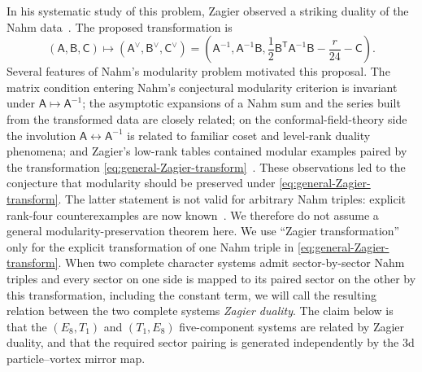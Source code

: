 \documentclass[11pt,a4paper]{article}
\numberwithin{equation}{section}
\begin{document}
In his systematic study of this problem, Zagier observed a striking duality of the Nahm data~\cite{Zagier:2007dilogarithm}.  The proposed transformation is
\begin{equation}
  (\mathsf A,\mathsf B,\mathsf C)
  \longmapsto
  (\mathsf A^\vee,\mathsf B^\vee,\mathsf C^\vee)
  =
  \left(
  \mathsf A^{-1},
  \mathsf A^{-1}\mathsf B,
  \frac12\mathsf B^{\mathsf T}\mathsf A^{-1}\mathsf B
  -\frac{r}{24}-\mathsf C
  \right).
  \label{eq:general-Zagier-transform}
\end{equation}
Several features of Nahm's modularity problem motivated this proposal.  The matrix condition entering Nahm's conjectural modularity criterion is invariant under $\mathsf A\mapsto\mathsf A^{-1}$; the asymptotic expansions of a Nahm sum and the series built from the transformed data are closely related; on the conformal-field-theory side the involution $\mathsf A\leftrightarrow\mathsf A^{-1}$ is related to familiar coset and level-rank duality phenomena; and Zagier's low-rank tables contained modular examples paired by the transformation \eqref{eq:general-Zagier-transform}~\cite{Zagier:2007dilogarithm,Wang:2024zagier}.  These observations led to the conjecture that modularity should be preserved under \eqref{eq:general-Zagier-transform}.  The latter statement is not valid for arbitrary Nahm triples: explicit rank-four counterexamples are now known~\cite{Wang:2024zagier}.  We therefore do not assume a general modularity-preservation theorem here.  We use ``Zagier transformation'' only for the explicit transformation of one Nahm triple in \eqref{eq:general-Zagier-transform}.  When two complete character systems admit sector-by-sector Nahm triples and every sector on one side is mapped to its paired sector on the other by this transformation, including the constant term, we will call the resulting relation between the two complete systems \emph{Zagier duality}.  The claim below is that the $(E_8,T_1)$ and $(T_1,E_8)$ five-component systems are related by Zagier duality, and that the required sector pairing is generated independently by the 3d particle--vortex mirror map.
\end{document}
